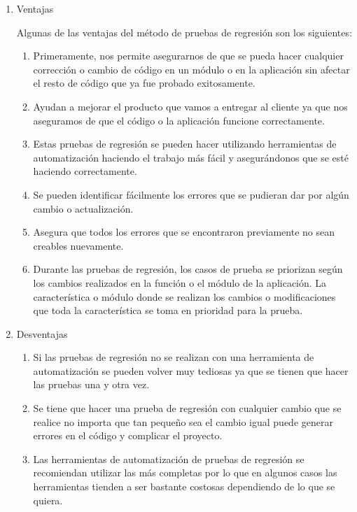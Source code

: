 \documentclass[conference]{IEEEtran}
\begin{document}
\begin{enumerate}

\item Ventajas 

Algunas de las ventajas del método de pruebas de regresión son los siguientes:

\begin{enumerate}[1.1]
\item Primeramente, nos permite asegurarnos de que se pueda hacer cualquier corrección o cambio de código en un módulo o en la aplicación sin afectar el resto de código que ya fue probado exitosamente.

\item Ayudan a mejorar el producto que vamos a entregar al cliente ya que nos aseguramos de que el código o la aplicación funcione correctamente.
\item Estas pruebas de regresión se pueden hacer utilizando herramientas de automatización haciendo el trabajo más fácil y asegurándonos que se esté haciendo correctamente.

\item Se pueden identificar fácilmente los errores que se pudieran dar por algún cambio o actualización.


\item Asegura que todos los errores que se encontraron previamente no sean creables nuevamente.

\item Durante las pruebas de regresión, los casos de prueba se priorizan según los cambios realizados en la función o el módulo de la aplicación. La característica o módulo donde se realizan los cambios o modificaciones que toda la característica se toma en prioridad para la prueba.
\end{enumerate}

\item Desventajas

\begin{enumerate}[2.1]
\item Si las pruebas de regresión no se realizan con una herramienta de automatización se pueden volver muy tediosas ya que se tienen que hacer las pruebas una y otra vez.

\item Se tiene que hacer una prueba de regresión con cualquier cambio que se realice no importa que tan pequeño sea el cambio igual puede generar errores en el código y complicar el proyecto.

\item Las herramientas de automatización de pruebas de regresión se recomiendan utilizar las más completas por lo que en algunos casos las herramientas tienden a ser bastante costosas dependiendo de lo que se quiera.
\end{enumerate}



\end{enumerate}
\end{document}
